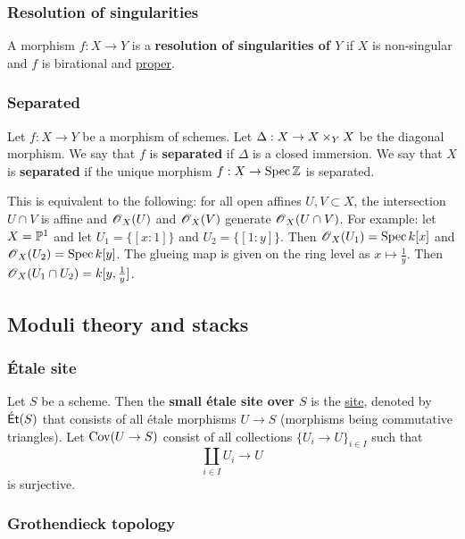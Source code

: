 \documentclass[11pt, english]{article}
\begin{document}
\subsubsection{Resolution of singularities}
\label{resolutionsing}

A morphism $f:X \to Y$ is a \textbf{resolution of singularities of $Y$} if $X$ is non-singular and $f$ is birational and \hyperref[proper]{proper}. 

\subsubsection{Separated}
\label{separated}
Let $f:X \to Y$ be a morphism of schemes. Let $\Delta:X \to X \times_Y X$ be the diagonal morphism. We say that $f$ is \textbf{separated} if $\Delta$ is a closed immersion. We say that $X$ is \textbf{separated} if the unique morphism $f:X \to \operatorname{Spec} \mathbb{Z}$ is separated.

This is equivalent to the following: for all open affines $U,V \subset X$, the intersection $U \cap V$ is affine and $\operatorname{\mathscr{O}}_X(U)$ and $\operatorname{\mathscr{O}}_X(V)$ generate $\operatorname{\mathscr{O}}_X(U \cap V)$. For example: let $X=\mathbb{P}^1$ and let $U_1=\{ [x:1] \}$ and $U_2= \{ [1:y] \}$. Then $\operatorname{\mathscr{O}}_X(U_1)=\operatorname{Spec} k[x]$ and $\operatorname{\mathscr{O}}_X(U_2)=\operatorname{Spec} k[y]$. The glueing map is given on the ring level as $x \mapsto \frac 1y$. Then $\operatorname{\mathscr{O}}_X(U_1 \cap U_2) = k[y,\frac 1y]$. 

\subsection{Moduli theory and stacks} 

\subsubsection{Étale site}
\label{etalesite}

Let $S$ be a scheme. Then the \textbf{small étale site over $S$} is the \hyperref[site]{site}, denoted by $\mathsf{\acute{E}t}(S)$ that consists of all étale morphisms $U \to S$ (morphisms being commutative triangles). Let $\operatorname{Cov}(U \to S)$ consist of all collections $\{ U_i \to U \}_{i \in I}$ such that
\[
\coprod_{i \in I} U_i \to U
\]
is surjective.

\subsubsection{Grothendieck topology}
\label{grothendiecktopology}
\end{document}
